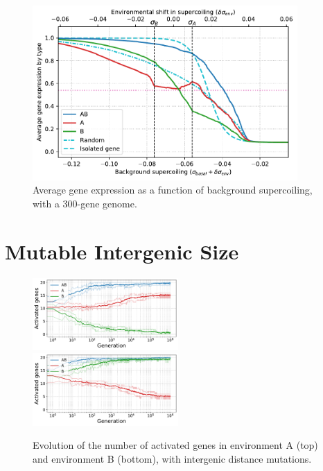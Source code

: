 \begin{figure}[H]
\centering
\includegraphics[width=0.9\textwidth]{param/300-genes/activity_sigmas_avg.pdf}
\caption[Average gene expression as a function of background supercoiling, with a 300-gene genome]{Average gene expression as a function of background supercoiling, with a 300-gene genome.}
\end{figure}








\FloatBlock

\section{Mutable Intergenic Size}


\begin{figure}[H]
  \centering
  \includegraphics[width=0.495\textwidth]{param/evolve-intergene/gene_activity_env_A.pdf}
  \includegraphics[width=0.495\textwidth]{param/evolve-intergene/gene_activity_env_B.pdf}
  \caption[Evolution of the number of activated genes in each environment, with intergenic distance mutations]{Evolution of the number of activated genes in environment A (top) and environment B (bottom), with intergenic distance mutations.}
  \end{figure}



